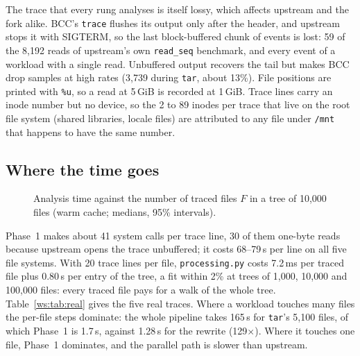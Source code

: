 The trace that every rung analyses is itself lossy, which affects upstream and the fork
alike. BCC's \texttt{trace} flushes its output only after the header, and upstream stops
it with SIGTERM, so the last block-buffered chunk of events is lost: 59 of the 8{,}192
reads of upstream's own \texttt{read\_seq} benchmark, and every event of a workload with a
single read. Unbuffered output recovers the tail but makes BCC drop samples at high
rates (3{,}739 during \texttt{tar}, about 13\%). File positions are printed with
\texttt{\%u}, so a read at 5\,GiB is recorded at 1\,GiB. Trace lines carry an inode number
but no device, so the 2 to 89 inodes per trace that live on the root file system
(shared libraries, locale files) are attributed to any file under \texttt{/mnt} that
happens to have the same number.

\subsection{Where the time goes}
\label{ws:time}

\begin{figure}[t]
\centering
{}
\caption{Analysis time against the number of traced files $F$ in a tree of 10{,}000 files
(warm cache; medians, 95\% intervals).}
\label{ws:fig:ladder}
\end{figure}

Phase~1 makes about 41 system calls per trace line, 30 of them one-byte reads because
upstream opens the trace unbuffered; it costs 68--79\,\textmu s per line on all five file
systems. With 20 trace lines per file, \texttt{processing.py} costs 7.2\,ms per traced
file plus 0.80\,\textmu s per entry of the tree, a fit within 2\% at trees of 1{,}000,
10{,}000 and 100{,}000 files: every traced file pays for a walk of the whole tree.
Table~\ref{ws:tab:real} gives the five real traces. Where a workload touches many files
the per-file steps dominate: the whole pipeline takes 165\,s for \texttt{tar}'s 5{,}100
files, of which Phase~1 is 1.7\,s, against 1.28\,s for the rewrite (129$\times$). Where it
touches one file, Phase~1 dominates, and the parallel path is slower than upstream.

\begin{table}[t]
\centering
\caption{Real traces ($L$ lines, $F$ traced files), warm cache: seconds, median of seven
runs, for upstream \texttt{processing.py} (a), the best \texttt{--parallel} setting (d),
the rewrite (c), and the whole pipeline (\texttt{processing.py}, \texttt{merge.py},
\texttt{hotness.sh}) against the rewrite doing all three steps.}
\label{ws:tab:real}
\small
{}
\end{table}

